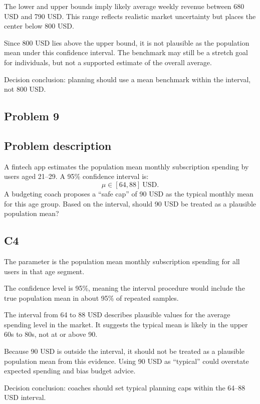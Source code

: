 \begin{ExamProblems}
		The lower and upper bounds imply likely average weekly revenue between 680 USD and 790 USD.
		This range reflects realistic market uncertainty but places the center below 800 USD.

		Since 800 USD lies above the upper bound, it is not plausible as the population mean under this confidence interval.
		The benchmark may still be a stretch goal for individuals, but not a supported estimate of the overall average.

		Decision conclusion: planning should use a mean benchmark within the interval, not 800 USD.

		\newpage
		\item
		\subsection*{Problem 9}
		\subsection*{Problem description}
		A fintech app estimates the population mean monthly subscription spending by users aged 21--29.
		A 95\% confidence interval is:
		\[
		\mu \in [64, 88]\ \text{USD}.
		\]
		A budgeting coach proposes a ``safe cap'' of 90 USD as the typical monthly mean for this age group.
		Based on the interval, should 90 USD be treated as a plausible population mean?

		\subsection*{C4}
		The parameter is the population mean monthly subscription spending for all users in that age segment.

		The confidence level is 95\%, meaning the interval procedure would include the true population mean in about 95\% of repeated samples.

		The interval from 64 to 88 USD describes plausible values for the average spending level in the market.
		It suggests the typical mean is likely in the upper 60s to 80s, not at or above 90.

		Because 90 USD is outside the interval, it should not be treated as a plausible population mean from this evidence.
		Using 90 USD as ``typical'' could overstate expected spending and bias budget advice.

		Decision conclusion: coaches should set typical planning caps within the 64--88 USD interval.

		\newpage
		\item

\end{ExamProblems}
